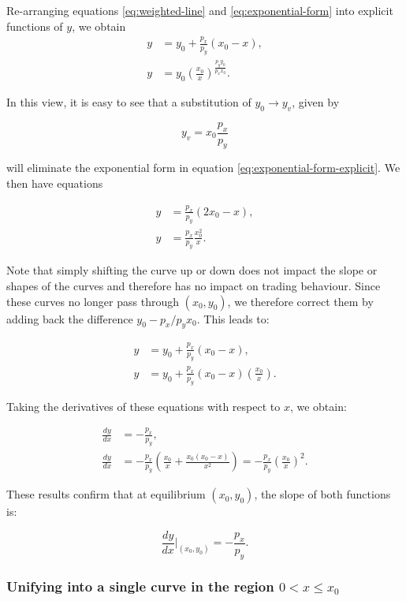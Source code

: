 \documentclass{article}
\begin{document}
Re-arranging equations \eqref{eq:weighted-line} and \eqref{eq:exponential-form} into explicit functions of $y$, we obtain
\begin{align}
    \label{eq:weighted-line-explicit}
    y &= y_0 + \frac{p_x}{ p_y} (x_0 - x), \\
    \label{eq:exponential-form-explicit}
    y &= y_0 \left( \frac{x_0}{x} \right)^{\frac{p_y y_0}{p_x x_0}}.
\end{align}

In this view, it is easy to see that a substitution of $y_0 \rightarrow y_v$, given by

\[
y_v = x_0 \frac{p_x}{p_y}
\]

will eliminate the exponential form in equation \eqref{eq:exponential-form-explicit}. We then have equations

\begin{align}
    y &= \frac{p_x}{p_y} (2x_0 - x), \\
    y &= \frac{p_x}{p_y} \frac{x_0^2}{x}.
\end{align}

Note that simply shifting the curve up or down does not impact the slope or shapes of the curves and therefore has no impact on trading behaviour. Since these curves no longer pass through \( (x_0, y_0) \), we therefore correct them by adding back the difference \( y_0 - p_x / p_y x_0 \). This leads to:

\begin{align}
    y &= y_0 + \frac{p_x}{p_y} (x_0 - x), \\
    y &= y_0 + \frac{p_x}{p_y} (x_0 - x) \left( \frac{x_0}{x} \right).
\end{align}

Taking the derivatives of these equations with respect to $x$, we obtain:

\begin{align}
    \frac{dy}{dx} &= -\frac{p_x}{p_y}, \\
    \frac{dy}{dx} &= -\frac{p_x}{p_y} \left( \frac{x_0}{x} + \frac{x_0(x_0 - x)}{x^2} \right)
    = -\frac{p_x}{p_y} \left( \frac{x_0}{x} \right)^2.
\end{align}

These results confirm that at equilibrium $(x_0, y_0)$, the slope of both functions is:

\[
\frac{dy}{dx} \Big|_{(x_0, y_0)} = -\frac{p_x}{p_y}.
\]

\subsubsection{Unifying into a single curve in the region $0 < x \leq x_0$}
\end{document}
